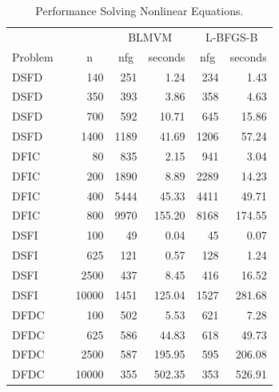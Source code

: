 \begin{table}[bhpt]
\begin{center}
\footnotesize
\begin{tabular}{|lrr|rr|rr|}
\hline
\multicolumn{3}{|c|}{} &
\multicolumn{2}{c|}{BLMVM} &
\multicolumn{2}{c|}{L-BFGS-B} \\

\multicolumn{1}{|c}{Problem}&
\multicolumn{1}{c}{}&
\multicolumn{1}{c|}{n}&
\multicolumn{1}{c}{nfg}&
\multicolumn{1}{c|}{seconds}&
\multicolumn{1}{c}{nfg} &
\multicolumn{1}{c|}{seconds} \\
\hline
DSFD & & 140 &  251 & 1.24 &  234 &  1.43  \\ 
DSFD & & 350 &  393 & 3.86 &  358 &  4.63  \\ 
DSFD & & 700 &  592 & 10.71 &  645 &  15.86  \\ 
DSFD & & 1400 &  1189 & 41.69 &  1206 &  57.24  \\ 
DFIC & & 80 &  835 & 2.15 &  941 &  3.04  \\ 
DFIC & & 200 &  1890 & 8.89 &  2289 &  14.23  \\ 
DFIC & & 400 &  5444 & 45.33 &  4411 &  49.71  \\ 
DFIC & & 800 &  9970 & 155.20 &  8168 &  174.55  \\ 
DSFI & & 100 &  49 & 0.04 &  45 &  0.07  \\ 
DSFI & & 625 &  121 & 0.57 &  128 &  1.24  \\ 
DSFI & & 2500 &  437 & 8.45 &  416 &  16.52  \\ 
DSFI & & 10000 &  1451 & 125.04 &  1527 &  281.68  \\ 
DFDC & & 100 &  502 & 5.53 &  621 &  7.28  \\ 
DFDC & & 625 &  586 & 44.83 &  618 &  49.73  \\ 
DFDC & & 2500 &  587 & 195.95 &  595 &  206.08  \\ 
DFDC & & 10000 &  355 & 502.35 &  353 &  526.91  \\ 
\hline
\end{tabular}
\caption{Performance Solving Nonlinear Equations.}
\label{minpacksys}
\end{center}
\end{table}




